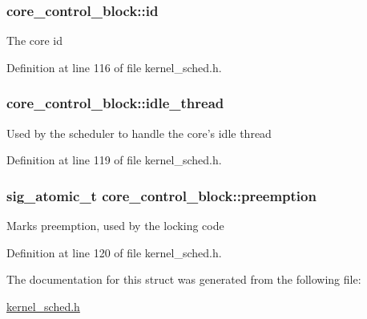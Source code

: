 \hypertarget{structcore__control__block_a5208867f309bdd1656fd473f38b30bfe}{
\subsubsection[{id}]{ core\-\_\-control\-\_\-block\-::id}}\label{structcore__control__block_a5208867f309bdd1656fd473f38b30bfe}
The core id 

Definition at line 116 of file kernel\-\_\-sched.\-h.

\hypertarget{structcore__control__block_a6dd29dab4a95ce740f45370345408c52}{
\subsubsection[{idle\-\_\-thread}]{ core\-\_\-control\-\_\-block\-::idle\-\_\-thread}}\label{structcore__control__block_a6dd29dab4a95ce740f45370345408c52}
Used by the scheduler to handle the core's idle thread 

Definition at line 119 of file kernel\-\_\-sched.\-h.

\hypertarget{structcore__control__block_a858cde45d4478d73f60e839594b363f4}{
\subsubsection[{preemption}]{\setlength{\rightskip}{0pt plus 5cm}sig\-\_\-atomic\-\_\-t core\-\_\-control\-\_\-block\-::preemption}}\label{structcore__control__block_a858cde45d4478d73f60e839594b363f4}
Marks preemption, used by the locking code 

Definition at line 120 of file kernel\-\_\-sched.\-h.



The documentation for this struct was generated from the following file\-:\begin{DoxyCompactItemize}
\item 
\hyperlink{kernel__sched_8h}{kernel\-\_\-sched.\-h}\end{DoxyCompactItemize}

